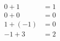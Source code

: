 \documentclass[preview]{standalone}
\begin{document}
\begin{align*}
0 + 1 & = 1 \\ 0 + 0 & = 0 \\ 1 + (-1) & = 0 \\ -1 + 3 & = 2
\end{align*}
\end{document}
